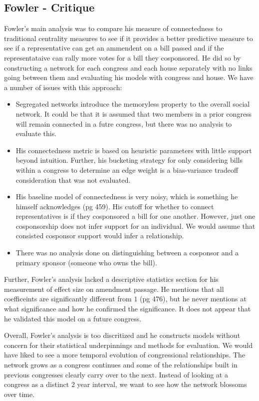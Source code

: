 \subsection{Fowler - Critique}

Fowler's main analysis was to compare his measure of connectedness to 
traditional centrality measures to see if it provides a better predictive 
measure to see if a representative can get an ammendent on a bill passed and 
if the representataive can rally more votes for a bill they cosponsored. He 
did so by constructing a network for each congress and each house separately 
with no links going between them and evaluating his models with congress and 
house. We have a number of issues with this approach:

\begin{itemize}
	\item Segregated networks introduce the memoryless property to the overall 
	social network. It could be that it is assumed that two members in a 
	prior congress will remain connected in a futre congress, but there was no 
	analysis to evaluate this. 
	\item His connectedness metric is based on heuristic parameters with little 
	support beyond intuition. Further, his bucketing strategy for only 
	considering bills within a congress to determine an edge weight is a 
	bias-variance tradeoff consideration that was not evaluated.
	\item His baseline model of connectedness is very noisy, which is something 
	he himself acknowledges (pg 459). His cutoff for whether to connect 
	representatives is if they cosponsored a bill for one another. However, 
	just one cosponsorship does not infer support for an individual. We would 
	assume that consisted cosponsor support would infer a relationship. 
	\item There was no analysis done on distinguishing between a cosponsor and 
	a primary sponsor (someone who owns the bill).
\end{itemize}

Further, Fowler's analysis lacked a descriptive statistics section for his 
measurement of effect size on amendment passage. He mentions that all 
coefficeints are significantly different from $1$ (pg 476), but he never 
mentions at what significance and how he confirmed the significance. It does 
not appear that he validated this model on a future congress.

Overall, Fowler's analysis is too discritized and he constructs models without 
concern for their statistical underpinnings and methods for evaluation. We 
would have liked to see a more temporal evolution of congressional 
relationships. The network grows as a congress continues and some of the 
relationships built in previous congresses clearly carry over to the next. 
Instead of looking at a congress as a distinct $2$ year interval, we want to 
see how the network blossoms over time.